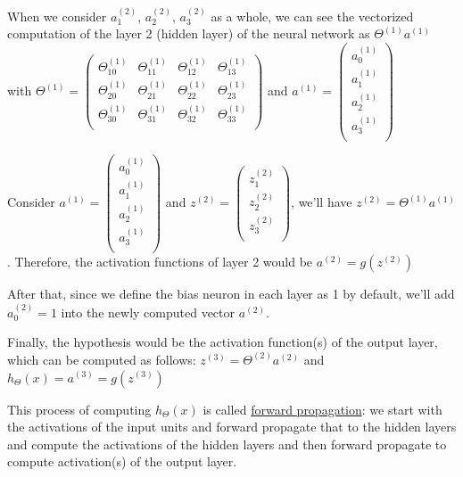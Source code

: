 \documentclass[12pt]{article}
\begin{document}
	When we consider $a_1^{(2)}$, $a_2^{(2)}$, $a_3^{(2)}$ as a whole, we can see the vectorized computation of the layer 2 (hidden layer) of the neural network as $\Theta^{(1)} a^{(1)}$ with $\Theta^{(1)}=\begin{pmatrix} \Theta_{10}^{(1)} & \Theta_{11}^{(1)} & \Theta_{12}^{(1)} & \Theta_{13}^{(1)} \\ \Theta_{20}^{(1)} & \Theta_{21}^{(1)} & \Theta_{22}^{(1)} & \Theta_{23}^{(1)} \\ \Theta_{30}^{(1)} & \Theta_{31}^{(1)} & \Theta_{32}^{(1)} & \Theta_{33}^{(1)} \\ \end{pmatrix}$ and $a^{(1)}=\begin{pmatrix} a_0^{(1)} \\ a_1^{(1)} \\ a_2^{(1)} \\ a_3^{(1)} \\ \end{pmatrix}$
	
	Consider $a^{(1)}=\begin{pmatrix} a_0^{(1)} \\ a_1^{(1)} \\ a_2^{(1)} \\ a_3^{(1)} \\ \end{pmatrix}$ and $z^{(2)}=\begin{pmatrix} z_1^{(2)} \\ z_2^{(2)} \\ z_3^{(2)} \\ \end{pmatrix}$, we'll have $z^{(2)}=\Theta^{(1)} a^{(1)}$. Therefore, the activation functions of layer 2 would be $a^{(2)}=g(z^{(2)})$
	
	After that, since we define the bias neuron in each layer as 1 by default, we'll add $a_0^{(2)}=1$ into the newly computed vector $a^{(2)}$.
	
	Finally, the hypothesis would be the activation function(s) of the output layer, which can be computed as follows: $z^{(3)}=\Theta^{(2)} a^{(2)}$ and $h_\Theta (x)=a^{(3)}=g(z^{(3)})$
	
	This process of computing $h_\Theta (x)$ is called \underline{forward propagation}: we start with the activations of the input units and forward propagate that to the hidden layers and compute the activations of the hidden layers and then forward propagate to compute activation(s) of the output layer. 
	
\end{document}
